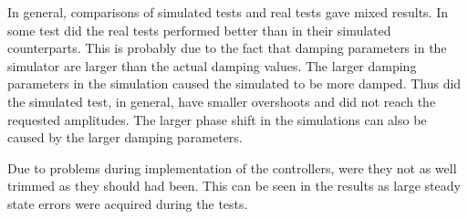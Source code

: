 In general, comparisons of simulated tests and real tests gave mixed results. In some test did the real tests performed better than in their simulated counterparts. This is probably due to the fact that damping parameters in the simulator are larger than the actual damping values. The larger damping parameters in the simulation caused the simulated \abbrROV to be more damped. Thus did the simulated test, in general, have smaller overshoots and did not reach the requested amplitudes. The larger phase shift in the simulations can also be caused by the larger damping parameters.  

Due to problems during implementation of the controllers, were they not as well trimmed as they should had been. This can be seen in the results as large steady state errors were acquired during the tests. 
